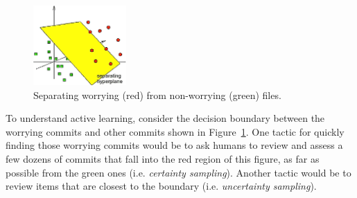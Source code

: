 \documentclass[10pt,journal,compsoc]{IEEEtran}
\newcommand{\fig}[1]{Figure~\ref{fig:#1}}
\newcommand{\tion}[1]{\S\ref{tion:#1}}
\begin{document}


 \begin{figure} 
\includegraphics[width=1.4in]{svm.png}
 \caption{ Separating worrying (red) from  non-worrying (green) files.}\label{fig:svm}
 \end{figure}To understand   active learning,  consider the decision boundary between the worrying commits and 
 other commits shown in \fig{svm}. 
 One tactic for quickly
 finding those worrying commits would be to ask humans to review and assess a few dozens of commits that fall into the red region of this figure, as far as possible from the green ones (i.e. {\em certainty sampling}). Another tactic would be to review items that are closest to the boundary (i.e. {\em uncertainty sampling}). 
 
\end{document}
